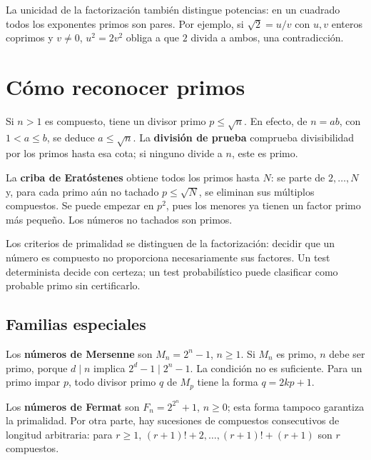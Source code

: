 La unicidad de la factorización también distingue potencias:
en un cuadrado todos los exponentes primos son pares.
Por ejemplo, si $\sqrt2=u/v$ con $u,v$ enteros coprimos y $v\ne0$,
$u^2=2v^2$ obliga a que $2$ divida a ambos, una contradicción.

\section{Cómo reconocer primos}

Si $n>1$ es compuesto, tiene un divisor primo $p\le\sqrt n$.
En efecto, de $n=ab$, con $1<a\le b$, se deduce $a\le\sqrt n$.
La \textbf{división de prueba} comprueba divisibilidad por los primos
hasta esa cota; si ninguno divide a $n$, este es primo.

La \textbf{criba de Eratóstenes} obtiene todos los primos hasta $N$:
se parte de $2,\ldots,N$ y, para cada primo aún no tachado
$p\le\sqrt N$, se eliminan sus múltiplos compuestos. Se puede empezar
en $p^2$, pues los menores ya tienen un factor primo más pequeño.
Los números no tachados son primos.

Los criterios de primalidad se distinguen de la factorización:
decidir que un número es compuesto no proporciona necesariamente sus factores.
Un test determinista decide con certeza; un test probabilístico
puede clasificar como probable primo sin certificarlo.

\subsection*{Familias especiales}

Los \textbf{números de Mersenne} son $M_n=2^n-1$, $n\ge1$.
Si $M_n$ es primo, $n$ debe ser primo, porque $d\mid n$ implica
$2^d-1\mid2^n-1$. La condición no es suficiente.
Para un primo impar $p$, todo divisor primo $q$ de $M_p$ tiene
la forma $q=2kp+1$.

Los \textbf{números de Fermat} son $F_n=2^{2^n}+1$, $n\ge0$;
esta forma tampoco garantiza la primalidad.
Por otra parte, hay sucesiones de compuestos consecutivos de longitud
arbitraria: para $r\ge1$, $(r+1)!+2,\ldots,(r+1)!+(r+1)$ son $r$ compuestos.

